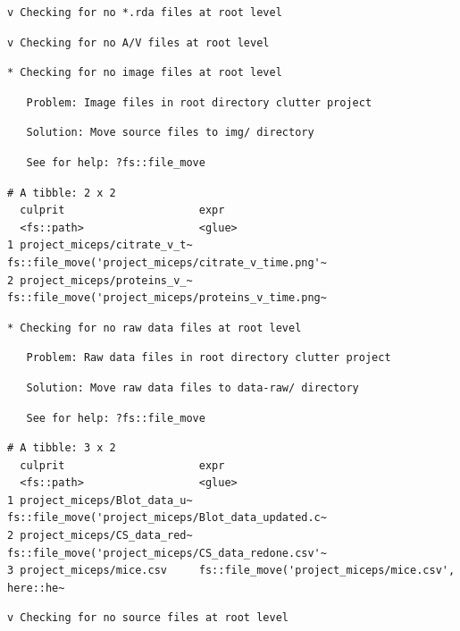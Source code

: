 \documentclass[12pt,twoside]{reedthesis}
\begin{document}
\begin{verbatim}
v Checking for no *.rda files at root level
\end{verbatim}
\begin{verbatim}
v Checking for no A/V files at root level
\end{verbatim}
\begin{verbatim}
* Checking for no image files at root level
\end{verbatim}
\begin{verbatim}
   Problem: Image files in root directory clutter project
\end{verbatim}
\begin{verbatim}
   Solution: Move source files to img/ directory
\end{verbatim}
\begin{verbatim}
   See for help: ?fs::file_move
\end{verbatim}
\begin{verbatim}
# A tibble: 2 x 2
  culprit                     expr                                              
  <fs::path>                  <glue>                                            
1 project_miceps/citrate_v_t~ fs::file_move('project_miceps/citrate_v_time.png'~
2 project_miceps/proteins_v_~ fs::file_move('project_miceps/proteins_v_time.png~
\end{verbatim}
\begin{verbatim}
* Checking for no raw data files at root level
\end{verbatim}
\begin{verbatim}
   Problem: Raw data files in root directory clutter project
\end{verbatim}
\begin{verbatim}
   Solution: Move raw data files to data-raw/ directory
\end{verbatim}
\begin{verbatim}
   See for help: ?fs::file_move
\end{verbatim}
\begin{verbatim}
# A tibble: 3 x 2
  culprit                     expr                                              
  <fs::path>                  <glue>                                            
1 project_miceps/Blot_data_u~ fs::file_move('project_miceps/Blot_data_updated.c~
2 project_miceps/CS_data_red~ fs::file_move('project_miceps/CS_data_redone.csv'~
3 project_miceps/mice.csv     fs::file_move('project_miceps/mice.csv', here::he~
\end{verbatim}
\begin{verbatim}
v Checking for no source files at root level
\end{verbatim}
\end{document}
